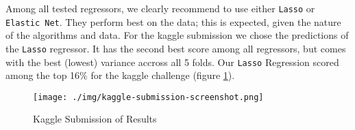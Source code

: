 Among all tested regressors, we clearly recommend to use either \texttt{Lasso} or \texttt{Elastic Net}. They perform best on the data; this is expected, given the nature of the algorithms and data. For the kaggle submission we chose the predictions of the \texttt{Lasso} regressor. It has the second best score among all regressors, but comes with the best (lowest) variance accross all 5 folds. Our \texttt{Lasso} Regression scored among the top 16\% for the kaggle challenge (figure \ref{fig:kaggle-submission}).

\begin{figure}[h]
    \centering
    \texttt{[image: ./img/kaggle-submission-screenshot.png]}
    \caption{Kaggle Submission of Results}
    \label{fig:kaggle-submission}
\end{figure}